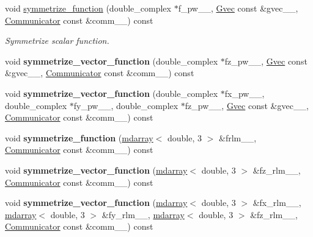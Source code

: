 \begin{DoxyCompactItemize}
\item 
void \hyperlink{classsirius_1_1_symmetry_ae15843c3eef616e02c82455b8ff48db1}{symmetrize\+\_\+function} (double\+\_\+complex $\ast$f\+\_\+pw\+\_\+\+\_\+, \hyperlink{classsddk_1_1_gvec}{Gvec} const \&gvec\+\_\+\+\_\+, \hyperlink{classsddk_1_1_communicator}{Communicator} const \&comm\+\_\+\+\_\+) const 
\begin{DoxyCompactList}\small\item\em Symmetrize scalar function. \end{DoxyCompactList}\item 
\hypertarget{classsirius_1_1_symmetry_a107f7292bac7e1e7ab327582757450af}{}void {\bfseries symmetrize\+\_\+vector\+\_\+function} (double\+\_\+complex $\ast$fz\+\_\+pw\+\_\+\+\_\+, \hyperlink{classsddk_1_1_gvec}{Gvec} const \&gvec\+\_\+\+\_\+, \hyperlink{classsddk_1_1_communicator}{Communicator} const \&comm\+\_\+\+\_\+) const \label{classsirius_1_1_symmetry_a107f7292bac7e1e7ab327582757450af}

\item 
\hypertarget{classsirius_1_1_symmetry_a0a5de6b8dff82c22840b1161651939e3}{}void {\bfseries symmetrize\+\_\+vector\+\_\+function} (double\+\_\+complex $\ast$fx\+\_\+pw\+\_\+\+\_\+, double\+\_\+complex $\ast$fy\+\_\+pw\+\_\+\+\_\+, double\+\_\+complex $\ast$fz\+\_\+pw\+\_\+\+\_\+, \hyperlink{classsddk_1_1_gvec}{Gvec} const \&gvec\+\_\+\+\_\+, \hyperlink{classsddk_1_1_communicator}{Communicator} const \&comm\+\_\+\+\_\+) const \label{classsirius_1_1_symmetry_a0a5de6b8dff82c22840b1161651939e3}

\item 
\hypertarget{classsirius_1_1_symmetry_a53767d829fd2a7e368485557d308ef0a}{}void {\bfseries symmetrize\+\_\+function} (\hyperlink{classsddk_1_1mdarray}{mdarray}$<$ double, 3 $>$ \&frlm\+\_\+\+\_\+, \hyperlink{classsddk_1_1_communicator}{Communicator} const \&comm\+\_\+\+\_\+) const \label{classsirius_1_1_symmetry_a53767d829fd2a7e368485557d308ef0a}

\item 
\hypertarget{classsirius_1_1_symmetry_af54c5f6f54de6d47b942aaecb909f4e4}{}void {\bfseries symmetrize\+\_\+vector\+\_\+function} (\hyperlink{classsddk_1_1mdarray}{mdarray}$<$ double, 3 $>$ \&fz\+\_\+rlm\+\_\+\+\_\+, \hyperlink{classsddk_1_1_communicator}{Communicator} const \&comm\+\_\+\+\_\+) const \label{classsirius_1_1_symmetry_af54c5f6f54de6d47b942aaecb909f4e4}

\item 
\hypertarget{classsirius_1_1_symmetry_a0c8ee0164c1da59cfadbc4132775607f}{}void {\bfseries symmetrize\+\_\+vector\+\_\+function} (\hyperlink{classsddk_1_1mdarray}{mdarray}$<$ double, 3 $>$ \&fx\+\_\+rlm\+\_\+\+\_\+, \hyperlink{classsddk_1_1mdarray}{mdarray}$<$ double, 3 $>$ \&fy\+\_\+rlm\+\_\+\+\_\+, \hyperlink{classsddk_1_1mdarray}{mdarray}$<$ double, 3 $>$ \&fz\+\_\+rlm\+\_\+\+\_\+, \hyperlink{classsddk_1_1_communicator}{Communicator} const \&comm\+\_\+\+\_\+) const \label{classsirius_1_1_symmetry_a0c8ee0164c1da59cfadbc4132775607f}


\end{DoxyCompactItemize}
